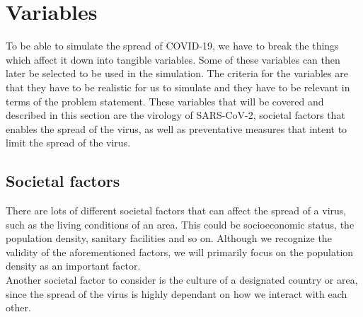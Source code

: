 
\section{Variables}
To be able to simulate the spread of COVID-19, we have to break the things which affect it down into tangible variables. Some of these variables can then later be selected to be used in the simulation. The criteria for the variables are that they have to be realistic for us to simulate and they have to be relevant in terms of the problem statement. These variables that will be covered and described in this section are the virology of SARS-CoV-2, societal factors that enables the spread of the virus, as well as preventative measures that intent to limit the spread of the virus.


\subsection{Societal factors}
There are lots of different societal factors that can affect the spread of a virus, such as the living conditions of an area. This could be socioeconomic status, the population density, sanitary facilities and so on. Although we recognize the validity of the aforementioned factors, we will primarily focus on the population density as an important factor.\\
Another societal factor to consider is the culture of a designated country or area, since the spread of the virus is highly dependant on how we interact with each other.



